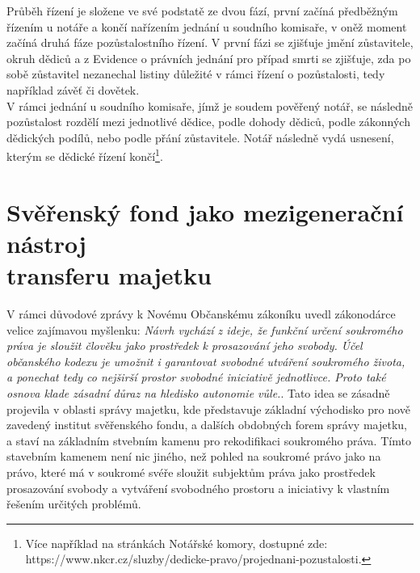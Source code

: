 \documentclass{article}
\begin{document}
Průběh řízení je složene ve své podstatě ze dvou fází, první začíná předběžným řízením u notáře a končí nařízením jednání u soudního komisaře, v oněž moment začíná druhá fáze pozůstalostního řízení. V první fázi se zjišťuje jmění zůstavitele, okruh dědiců a z Evidence o právních jednání pro případ smrti se zjišťuje, zda po sobě zůstavitel nezanechal listiny důležité v rámci řízení o pozůstalosti, tedy například závěť či dovětek.\\

V rámci jednání u soudního komisaře, jímž je soudem pověřený notář, se následně pozůstalost rozdělí mezi jednotlivé dědice, podle dohody dědiců, podle zákonných dědických podílů, nebo podle přání zůstavitele. Notář následně vydá usnesení, kterým se dědické řízení končí\footnote{Více například na stránkách Notářské komory, dostupné zde: https://www.nkcr.cz/sluzby/dedicke-pravo/projednani-pozustalosti.}.\\


\newpage


\thispagestyle{smallertextinheader}

\section[Svěřenský fond jako mezigenerační nástroj transferu majetku]{Svěřenský fond jako mezigenerační nástroj\\ transferu majetku}

V rámci důvodové zprávy k Novému Občanskému zákoníku uvedl zákonodárce velice zajímavou myšlenku: \textit{Návrh vychází z ideje, že funkční určení soukromého práva je sloužit člověku jako prostředek k prosazování jeho svobody. Účel občanského kodexu je umožnit i garantovat svobodné utváření soukromého života, a ponechat tedy co nejširší prostor svobodné iniciativě jednotlivce. Proto také osnova klade zásadní důraz na hledisko autonomie vůle.}. Tato idea se zásadně projevila v oblasti správy majetku, kde představuje základní východisko pro nově zavedený institut svěřenského fondu, a dalších obdobných forem správy majetku, a staví na základním stvebním kamenu pro rekodifikaci soukromého práva. Tímto stavebním kamenem není nic jiného, než pohled na soukromé právo jako na právo, které má v soukromé svéře sloužit subjektům práva jako prostředek prosazování svobody a vytváření svobodného prostoru a iniciativy k vlastním řešením určitých problémů.\\
\end{document}
